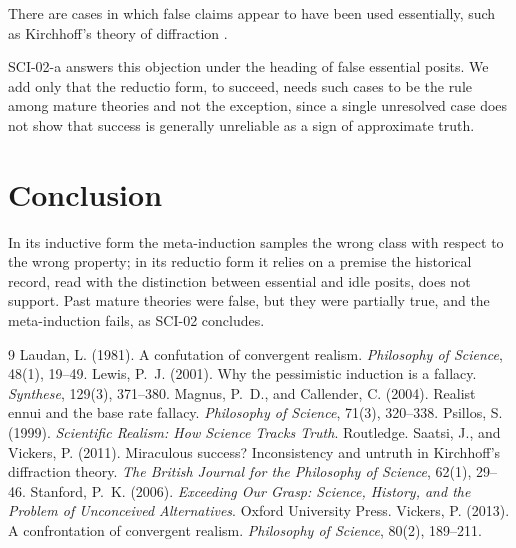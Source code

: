 \documentclass{situationist-preprint}
\begin{document}
\begin{objection}
There are cases in which false claims appear to have been used essentially, such as Kirchhoff's theory of diffraction \citep{SaatsiVickers2011}.
\end{objection}

\begin{reply}
SCI-02-a answers this objection under the heading of false essential posits. We add only that the reductio form, to succeed, needs such cases to be the rule among mature theories and not the exception, since a single unresolved case does not show that success is generally unreliable as a sign of approximate truth.
\end{reply}

\section{Conclusion}\label{s:conclusion}

In its inductive form the meta-induction samples the wrong class with respect to the wrong property; in its reductio form it relies on a premise the historical record, read with the distinction between essential and idle posits, does not support. Past mature theories were false, but they were partially true, and the meta-induction fails, as SCI-02 concludes.

\begin{thebibliography}{9}
 Laudan, L. (1981). A confutation of convergent realism. \emph{Philosophy of Science}, 48(1), 19--49.
 Lewis, P.~J. (2001). Why the pessimistic induction is a fallacy. \emph{Synthese}, 129(3), 371--380.
 Magnus, P.~D., and Callender, C. (2004). Realist ennui and the base rate fallacy. \emph{Philosophy of Science}, 71(3), 320--338.
 Psillos, S. (1999). \emph{Scientific Realism: How Science Tracks Truth}. Routledge.
 Saatsi, J., and Vickers, P. (2011). Miraculous success? Inconsistency and untruth in Kirchhoff's diffraction theory. \emph{The British Journal for the Philosophy of Science}, 62(1), 29--46.
 Stanford, P.~K. (2006). \emph{Exceeding Our Grasp: Science, History, and the Problem of Unconceived Alternatives}. Oxford University Press.
 Vickers, P. (2013). A confrontation of convergent realism. \emph{Philosophy of Science}, 80(2), 189--211.
\end{thebibliography}
\end{document}
